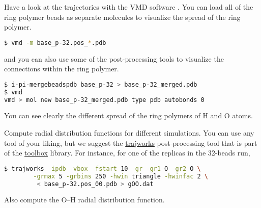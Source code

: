 \documentclass{article}
\begin{document}
\begin{Exercise}[label={basic},title={A PIMD simulation of liquid water}]
\Question
Have a look at the trajectories with the VMD software 
. 
You can load all of the ring polymer beads as separate molecules to visualize the
spread of the ring polymer.
\begin{lstlisting}[language=bash]
$ vmd -m base_p-32.pos_*.pdb 
\end{lstlisting}%
and you can also use some of the \ipi{} post-processing tools to visualize
the connections within the ring polymer. 
\begin{lstlisting}[language=bash]
$ i-pi-mergebeadspdb base_p-32 > base_p-32_merged.pdb
$ vmd
vmd > mol new base_p-32_merged.pdb type pdb autobonds 0
\end{lstlisting}
You can see clearly the different spread of the ring polymers of H and O atoms.

\Question
Compute radial distribution functions for different simulations. You
can use any tool of your liking, but we suggest the \url{trajworks} 
post-processing tool that is part of the \url{toolbox} library.
For instance, for one of the replicas in the 32-beads run,
\begin{lstlisting}[language=bash]
$ trajworks -ipdb -vbox -fstart 10 -gr -gr1 O -gr2 O \
        -grmax 5 -grbins 250 -hwin triangle -hwinfac 2 \
         < base_p-32.pos_00.pdb > gOO.dat
\end{lstlisting}%
Also compute the O--H radial distribution function.

\end{Exercise}
\end{document}
